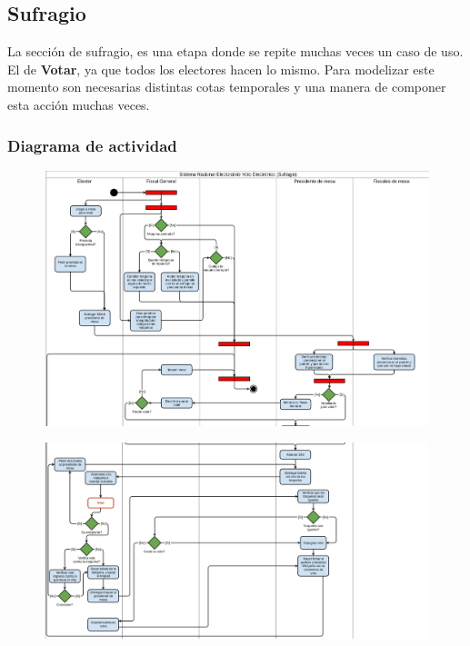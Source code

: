 \subsection{Sufragio}

La sección de sufragio, es una etapa donde se repite muchas veces un caso de uso. El de \textbf{Votar}, ya que todos los electores hacen lo mismo. Para modelizar este momento son necesarias distintas cotas temporales y una manera de componer esta acción muchas veces.





\subsubsection{Diagrama de actividad}
\begin{figure}[h!]
\centering
\includegraphics[scale=0.5]{imagenes/actividad/actividadSufragio1}
\end{figure}

\begin{figure}[h!]
\centering
\includegraphics[scale=0.5]{imagenes/actividad/actividadSufragio2}
\end{figure}

